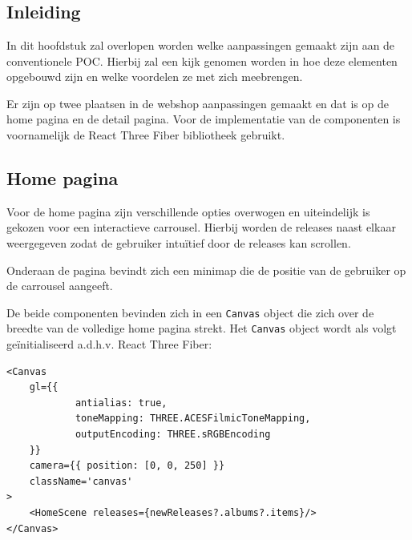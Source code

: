 
\chapter{}%
\label{ch:proofofconceptThreeJS}

\section{Inleiding}

In dit hoofdstuk zal overlopen worden welke aanpassingen gemaakt zijn aan de conventionele POC. Hierbij zal een kijk genomen worden in hoe deze elementen opgebouwd zijn en welke voordelen ze met zich meebrengen.

Er zijn op twee plaatsen in de webshop aanpassingen gemaakt en dat is op de home pagina en de detail pagina. Voor de implementatie van de componenten is voornamelijk de React Three Fiber bibliotheek gebruikt.

\section{Home pagina}

Voor de home pagina zijn verschillende opties overwogen en uiteindelijk is gekozen voor een interactieve carrousel. Hierbij worden de releases naast elkaar weergegeven zodat de gebruiker intuïtief door de releases kan scrollen.

Onderaan de pagina bevindt zich een minimap die de positie van de gebruiker op de carrousel aangeeft.

De beide componenten bevinden zich in een \texttt{Canvas} object die zich over de breedte van de volledige home pagina strekt. Het \texttt{Canvas} object wordt als volgt geïnitialiseerd a.d.h.v. React Three Fiber: 

\newpage

\begin{lstlisting}
<Canvas
	gl={{
			antialias: true,
			toneMapping: THREE.ACESFilmicToneMapping,
			outputEncoding: THREE.sRGBEncoding
	}}
	camera={{ position: [0, 0, 250] }}
	className='canvas'
>
	<HomeScene releases={newReleases?.albums?.items}/>
</Canvas>
\end{lstlisting}

